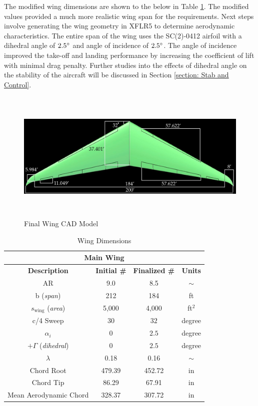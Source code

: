 The modified wing dimensions are shown to the below in Table \ref{tab:wingsizing}.  The modified values provided a much more realistic wing span for the requirements.  Next steps involve generating the wing geometry in XFLR5 to determine aerodynamic characteristics.  The entire span of the wing uses the SC(2)-0412 airfoil with a dihedral angle of $2.5\degree$ and angle of incidence of $2.5 \degree$.  The angle of incidence improved the take-off and landing performance by increasing the coefficient of lift with minimal drag penalty.  Further studies into the effects of dihedral angle on the stability of the aircraft will be discussed in Section \ref{section: Stab and Control}.

\begin{figure}[!h]
    \centering
    \includegraphics[height=2.5in,width=\textwidth]{Photos/aero/wing.jpg}
    \caption{Final Wing CAD Model}
    \label{fig:wingCAD}
\end{figure}

\begin{table}[!h]
    \centering
    \caption{Wing Dimensions}
    \begin{tabular}{|c|c|c|c|} \toprule
        \multicolumn{4}{c}{\textbf{\textcolor{cobalt}{Main Wing}}} \\ \midrule
        \textbf{Description} & \textbf{Initial \#} & \textbf{Finalized \#} & \textbf{Units} \\ \hline \hline
        AR & 9.0 & 8.5 & $\sim$ \\ \hline
        b (\textit{span}) & 212 & 184 & ft \\ \hline 
        $s_{\text{wing}}$ (\textit{area}) & 5,000 & 4,000 & ft$^2$ \\ \hline
        c/4 Sweep & 30 & $32$ & degree \\ \hline
        $\alpha_i$ & 0 & $2.5$ & degree \\ \hline
        $+\Gamma$ (\textit{dihedral}) & 0 & $2.5$ & degree \\ \hline
        $\lambda$ & 0.18 & 0.16 & $\sim$ \\ \hline
        Chord Root & 479.39 & 452.72 & in \\ \hline
        Chord Tip & 86.29 & 67.91 & in \\ \hline   
        Mean Aerodynamic Chord & 328.37 & 307.72 & in \\ \bottomrule
    \end{tabular}
    \label{tab:wingsizing}
\end{table}
\clearpage

